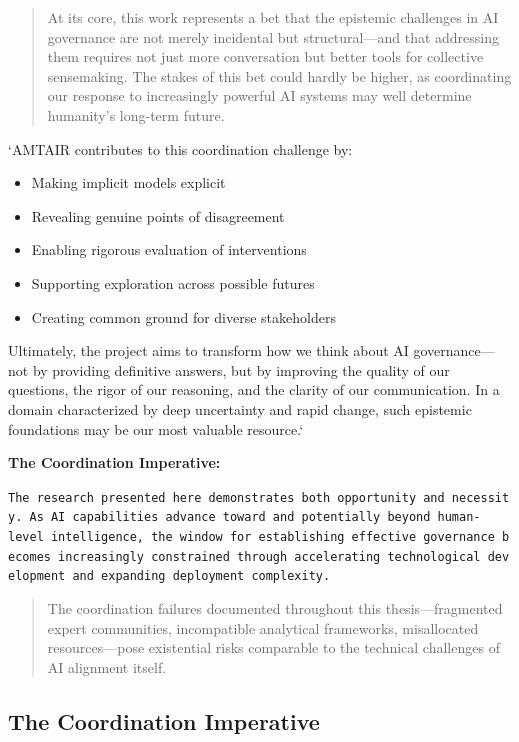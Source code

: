 \documentclass[
  11pt,
  letterpaper,
]{book}
\providecommand{\tightlist}{%
  \setlength{\itemsep}{0pt}\setlength{\parskip}{0pt}}
\begin{document}
\begin{quote}
At its core, this work represents a bet that the epistemic challenges in
AI governance are not merely incidental but structural---and that
addressing them requires not just more conversation but better tools for
collective sensemaking. The stakes of this bet could hardly be higher,
as coordinating our response to increasingly powerful AI systems may
well determine humanity's long-term future.
\end{quote}

`AMTAIR contributes to this coordination challenge by:

\begin{itemize}
\tightlist
\item
  Making implicit models explicit
\item
  Revealing genuine points of disagreement
\item
  Enabling rigorous evaluation of interventions
\item
  Supporting exploration across possible futures
\item
  Creating common ground for diverse stakeholders
\end{itemize}

Ultimately, the project aims to transform how we think about AI
governance---not by providing definitive answers, but by improving the
quality of our questions, the rigor of our reasoning, and the clarity of
our communication. In a domain characterized by deep uncertainty and
rapid change, such epistemic foundations may be our most valuable
resource.`

\textbf{The Coordination Imperative:}

\texttt{The\ research\ presented\ here\ demonstrates\ both\ opportunity\ and\ necessity.\ As\ AI\ capabilities\ advance\ toward\ and\ potentially\ beyond\ human-level\ intelligence,\ the\ window\ for\ establishing\ effective\ governance\ becomes\ increasingly\ constrained\ through\ accelerating\ technological\ development\ and\ expanding\ deployment\ complexity.}

\begin{quote}
The coordination failures documented throughout this thesis---fragmented
expert communities, incompatible analytical frameworks, misallocated
resources---pose existential risks comparable to the technical
challenges of AI alignment itself.
\end{quote}

\subsection{The Coordination
Imperative}\label{sec-coordination-imperative}
\end{document}
